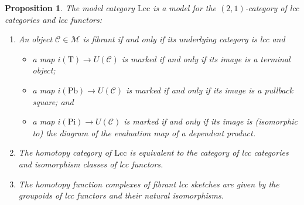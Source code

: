\documentclass[a4paper]{article}
\newtheorem{proposition}[theorem]{Proposition}
\theoremstyle{remark}
\theoremstyle{definition}
\begin{document}
\begin{proposition}
  \label{prop:lcc-model-cat}
  The model category $\mathrm{Lcc}$ is a model for the $(2, 1)$-category of lcc categories and lcc functors:
  \begin{enumerate}
    \item
      \label{itm:lcc-fibrant-objects}
      An object $\mathcal{C} \in \mathcal{M}$ is fibrant if and only if its underlying category is lcc and
      \begin{itemize}
        \item
          a map $i(\mathrm{T}) \rightarrow U(\mathcal{C})$ is marked if and only if its image is a terminal object;
        \item
          a map $i(\mathrm{Pb}) \rightarrow U(\mathcal{C})$ is marked if and only if its image is a  pullback square; and
        \item
          a map $i(\mathrm{Pi}) \rightarrow U(\mathcal{C})$ is marked if and only if its image is (isomorphic to) the diagram of the evaluation map of a dependent product.
      \end{itemize}
    \item
      \label{itm:lcc-homotopy-category}
      The homotopy category of $\mathrm{Lcc}$ is equivalent to the category of lcc categories and isomorphism classes of lcc functors.
    \item
      \label{itm:lcc-homotopy-function-complexes}
      The homotopy function complexes of fibrant lcc sketches are given by the groupoids of lcc functors and their natural isomorphisms.
  \end{enumerate}
\end{proposition}
\end{document}
